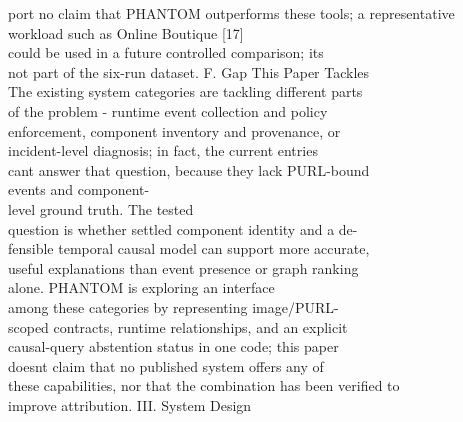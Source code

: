 \documentclass[conference]{IEEEtran}
\begin{document}
port no claim that PHANTOM outperforms these tools; a representative\\
workload such as Online Boutique {[}17{]}\\
could be used in a future controlled comparison; it\textquotesingle s\\
not part of the six-run dataset. F. Gap This Paper Tackles\\
The existing system categories are tackling different parts\\
of the problem - runtime event collection and policy\\
enforcement, component inventory and provenance, or\\
incident-level diagnosis; in fact, the current entries\\
can\textquotesingle t answer that question, because they lack PURL-bound\\
events and component-\\
level ground truth. The tested\\
question is whether settled component identity and a de-\\
fensible temporal causal model can support more accurate,\\
useful explanations than event presence or graph ranking\\
alone. PHANTOM is exploring an interface\\
among these categories by representing image/PURL-\\
scoped contracts, runtime relationships, and an explicit\\
causal-query abstention status in one code; this paper\\
doesn\textquotesingle t claim that no published system offers any of\\
these capabilities, nor that the combination has been verified to\\
improve attribution. III. System Design\\
\end{document}
